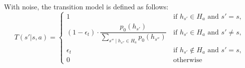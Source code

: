 



With noise, the transition model is defined as follows:
\begin{equation}
    T(s'|s, a) = \begin{cases}
        1       & \, \text{if } h_{s'} \in H_a \text{ and } s' = s, \\ %
        (1 - \epsilon_t) \cdot \dfrac{p_0(h_{s'})}{\sum_{s'' \mid h_{s''} \in H_a} p_0(h_{s''})} & \, \text{if } h_{s'} \in H_a \text{ and } s' \neq s, \\ %
        \epsilon_t & \, \text{if }  h_{s'} \notin H_a \text{ and } s' = s, \\ %
        0 & \, \text{otherwise}
    \end{cases}
    \label{eq:trans-model}
\end{equation}


